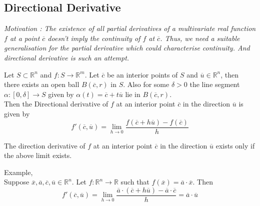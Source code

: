 \subsection{Directional Derivative}
	\textsl{Motivation : The existence of all partial derivatives of a multivariate real function $f$ at a point $\overline{c}$ doesn't imply the continuity of $f$ at $\overline{c}$.
	Thus, we need a suitable generalisation for the partial derivative which could characterise continuity.
	And directional derivative is such an attempt.}

\begin{definition}
	Let \(S \subset \mathbb{R}^n\) and \(f : S \to \mathbb{R}^m\).
	Let $\overline{c}$ be an interior points of $S$ and \( \overline{u} \in \mathbb{R}^n \), then there exists an open ball $B(\overline{c},r)$ in $S$.
	Also for some $\delta > 0$ the line segment \( \alpha : [0,\delta] \to S \) given by \( \alpha(t) = \overline{c}+t\overline{u} \) lie in $B(\overline{c},r)$.\\
	
	Then the Directional derivative of $f$ at an interior point $\overline{c}$ in the direction $\overline{u}$ is given by
	\[ f'(\overline{c},\overline{u}) = \lim_{h \to 0} \frac{f(\overline{c}+h\overline{u}) - f(\overline{c})}{h} \]
\end{definition}

\begin{remark}
	The direction derivative of $f$ at an interior point $\overline{c}$ in the direction $\overline{u}$ exists only if the above limit exists.
\end{remark}

\begin{remark}Example, \cite[Exercise 12.2a]{apostol}\\
	Suppose \(\overline{x},\overline{a},\overline{c},\overline{u} \in \mathbb{R}^n\).
	Let \(f : \mathbb{R}^n \to \mathbb{R}\) such that \(f(\overline{x}) = \overline{a}\cdot\overline{x}\).
	Then
	\[ f'(\overline{c},\overline{u}) = \lim_{h \to 0} \frac{\overline{a}\cdot(\overline{c}+h\overline{u}) - \overline{a}\cdot\overline{c}}{h} = \overline{a}\cdot\overline{u}\]
\end{remark}

